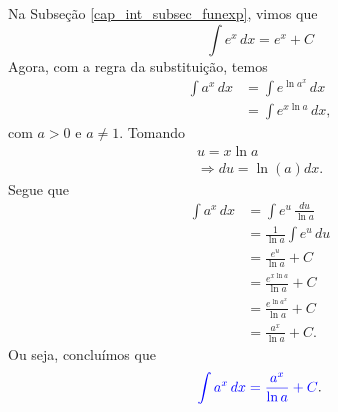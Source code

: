 Na Subseção \ref{cap_int_subsec_funexp}, vimos que
\begin{equation}
  \int e^x\,dx = e^x + C
\end{equation}
Agora, com a regra da substituição, temos
\begin{align}
  \int a^x\,dx &= \int e^{\ln a^x}\,dx \\
               &= \int e^{x\ln a}\,dx,
\end{align}
com $a>0$ e $a\neq 1$. Tomando
\begin{gather}
  u = x\ln a\\
  \Rightarrow du = \ln(a)dx.
\end{gather}
Segue que
\begin{align}
  \int a^x\,dx &= \int e^u\,\frac{du}{\ln a} \\
               &= \frac{1}{\ln a}\int e^u\,du \\
               &= \frac{e^u}{\ln a} + C \\
               &= \frac{e^{x\ln a}}{\ln a} + C \\
               &= \frac{e^{\ln a^x}}{\ln a} + C \\
               &= \frac{a^x}{\ln a} + C.
\end{align}
Ou seja, concluímos que
\begin{equation}
  {\color{blue}\int a^x\,dx = \frac{a^x}{\ln a} + C}.
\end{equation}

